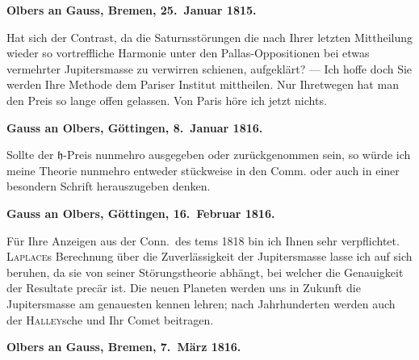 \documentclass[12pt,a4paper]{article}
\newcommand{\Jupiter}{\mathfrak{h}}
\begin{document}
\medskip\noindent
\textbf{Olbers an Gauss, Bremen, 25.~Januar 1815.}

{ Hat sich der Contrast, da die Saturnsstörungen die nach Ihrer letzten Mittheilung wieder so vortreffliche Harmonie unter den Pallas-Oppositionen bei etwas vermehrter Jupitersmasse zu verwirren schienen, aufgeklärt? --- Ich hoffe doch Sie werden Ihre Methode dem Pariser Institut mittheilen. Nur Ihretwegen hat man den Preis so lange offen gelassen. Von Paris höre ich jetzt nichts. }

\medskip\noindent
\textbf{Gauss an Olbers, Göttingen, 8.~Januar 1816.}

Sollte der $\Jupiter$-Preis nunmehro ausgegeben oder zurückgenommen sein, so würde ich meine Theorie nunmehro entweder stückweise in den Comm. oder auch in einer besondern Schrift herauszugeben denken.

\medskip\noindent
\textbf{Gauss an Olbers, Göttingen, 16.~Februar 1816.}

Für Ihre Anzeigen aus der Conn.~des tems 1818 bin ich Ihnen sehr verpflichtet. \textsc{Laplace}s Berechnung über die Zuverlässigkeit der Jupitersmasse lasse ich auf sich beruhen, da sie von seiner Störungstheorie abhängt, bei welcher die Genauigkeit der Resultate precär ist. Die neuen Planeten werden uns in Zukunft die Jupitersmasse am genauesten kennen lehren; nach Jahrhunderten werden auch der \textsc{Halley}sche und Ihr Comet beitragen.

\newpage
\setcounter{page}{437}
%
\medskip\noindent
\textbf{Olbers an Gauss, Bremen, 7.~März 1816.}
\end{document}
